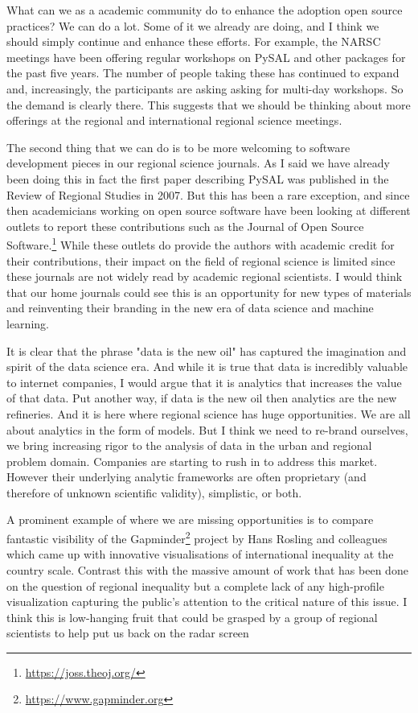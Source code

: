 \documentclass[11pt]{article}
\begin{document}
What can we as a academic community do to enhance the adoption open source
practices? We can do a lot. Some of it we already are doing, and I think we
should simply continue and enhance these efforts. For example, the NARSC
meetings have been offering regular workshops on PySAL and other packages
for the past five years. The number of people taking these has
continued to expand and, increasingly, the participants are asking asking for
multi-day workshops. So the demand is clearly there. This suggests that we
should be thinking about more offerings at the regional and international
regional science meetings.

The second thing that we can do is to be more welcoming to software development
pieces in our regional science journals. As I said we have already been doing
this in fact the first paper describing PySAL was published in the Review of
Regional Studies in 2007. But this has been a rare exception, and since then
academicians working on open source software have been looking at different
outlets to report these contributions such as the Journal of Open Source
Software.\footnote{\url{https://joss.theoj.org/}} While these outlets do provide the authors with academic credit for
their contributions, their impact on the field of regional science is limited
since these journals are not widely read by academic regional scientists. I
would think that our home journals could see this is an opportunity for new
types of materials and reinventing their branding in the new era of  
data science and machine learning. 


It is clear that the phrase "data is the new oil" has captured the imagination
and spirit of the data science era. And while it is true that data is incredibly
valuable to internet companies, I would argue that it is analytics that
increases the value of that data. Put another way, if data is the new oil then
analytics are the new refineries. And it is here where regional science has huge
opportunities. We are all about analytics in the form of models. But I think we
need to re-brand ourselves, we bring increasing rigor to the analysis of data in
the urban and regional problem domain.  Companies are starting to rush in
to address this market. However their underlying analytic frameworks are often
proprietary (and therefore of unknown scientific validity), simplistic, or both.

A prominent example of where we are missing opportunities is to compare
fantastic visibility of the Gapminder\footnote{\url{https://www.gapminder.org}} project by
Hans Rosling and colleagues which came up with innovative visualisations of
international inequality at the country scale. Contrast this with the massive
amount of work that has been done on the question of regional inequality but
a complete lack of any high-profile visualization capturing the public's
attention to the critical nature of this issue. I think this is low-hanging
fruit that could be grasped by a group of regional scientists to help put
us back on the radar screen
\end{document}
